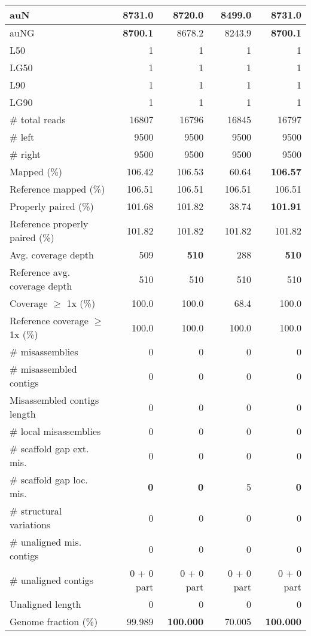 \documentclass[12pt,a4paper]{article}
\begin{document}
\begin{table}[ht]
\begin{center}
\begin{tabular}{|l*{4}{|r}|}
auN & {\bf 8731.0} & 8720.0 & 8499.0 & {\bf 8731.0} \\ \hline
auNG & {\bf 8700.1} & 8678.2 & 8243.9 & {\bf 8700.1} \\ \hline
L50 & 1 & 1 & 1 & 1 \\ \hline
LG50 & 1 & 1 & 1 & 1 \\ \hline
L90 & 1 & 1 & 1 & 1 \\ \hline
LG90 & 1 & 1 & 1 & 1 \\ \hline
\# total reads & 16807 & 16796 & 16845 & 16797 \\ \hline
\# left & 9500 & 9500 & 9500 & 9500 \\ \hline
\# right & 9500 & 9500 & 9500 & 9500 \\ \hline
Mapped (\%) & 106.42 & 106.53 & 60.64 & {\bf 106.57} \\ \hline
Reference mapped (\%) & 106.51 & 106.51 & 106.51 & 106.51 \\ \hline
Properly paired (\%) & 101.68 & 101.82 & 38.74 & {\bf 101.91} \\ \hline
Reference properly paired (\%) & 101.82 & 101.82 & 101.82 & 101.82 \\ \hline
Avg. coverage depth & 509 & {\bf 510} & 288 & {\bf 510} \\ \hline
Reference avg. coverage depth & 510 & 510 & 510 & 510 \\ \hline
Coverage $\geq$ 1x (\%) & 100.0 & 100.0 & 68.4 & 100.0 \\ \hline
Reference coverage $\geq$ 1x (\%) & 100.0 & 100.0 & 100.0 & 100.0 \\ \hline
\# misassemblies & 0 & 0 & 0 & 0 \\ \hline
\# misassembled contigs & 0 & 0 & 0 & 0 \\ \hline
Misassembled contigs length & 0 & 0 & 0 & 0 \\ \hline
\# local misassemblies & 0 & 0 & 0 & 0 \\ \hline
\# scaffold gap ext. mis. & 0 & 0 & 0 & 0 \\ \hline
\# scaffold gap loc. mis. & {\bf 0} & {\bf 0} & 5 & {\bf 0} \\ \hline
\# structural variations & 0 & 0 & 0 & 0 \\ \hline
\# unaligned mis. contigs & 0 & 0 & 0 & 0 \\ \hline
\# unaligned contigs & 0 + 0 part & 0 + 0 part & 0 + 0 part & 0 + 0 part \\ \hline
Unaligned length & 0 & 0 & 0 & 0 \\ \hline
Genome fraction (\%) & 99.989 & {\bf 100.000} & 70.005 & {\bf 100.000} \\ \hline

\end{tabular}
\end{center}
\end{table}
\end{document}
